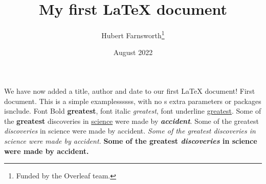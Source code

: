 \documentclass[12pt, letterpaper]{article}
\title{My first LaTeX document}
\author{Hubert Farnsworth\thanks{Funded by the Overleaf team.}}
\date{August 2022}
\begin{document}
\maketitle
We have now added a title, author and date to our first \LaTeX{} document!
First document. This is a simple examplessssss, with no s
extra parameters or packages isnclude. Font Bold \textbf{greatest},
font italic \textit{greatest}, font underline \underline{greatest}.
Some of the \textbf{greatest}
discoveries in \underline{science} 
were made by \textbf{\textit{accident}}. Some of the greatest \emph{discoveries} in science 
were made by accident. \textit{Some of the greatest \emph{discoveries} 
in science were made by accident.} \textbf{Some of the greatest \emph{discoveries} 
in science were made by accident.}
\end{document}
